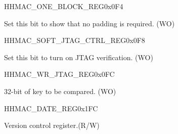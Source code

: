 \begin{register}{H}{HMAC\_ONE\_BLOCK\_REG}{0x{}0F4}\label{regdesc:HMACONEBLOCKREG}
%
%
\regnewline%
\begin{regdesc}\begin{reglist}
\label{fielddesc:HMACSETONEBLOCK}\item [HMAC\_SET\_ONE\_BLOCK] Set this bit to show that no padding is required. (WO)
\end{reglist}\end{regdesc}
\end{register}

\begin{register}{H}{HMAC\_SOFT\_JTAG\_CTRL\_REG}{0x{}0F8}\label{regdesc:HMACSOFTJTAGCTRLREG}
%
%
\regnewline%
\begin{regdesc}\begin{reglist}
\label{fielddesc:HMACSOFTJTAGCTRL}\item [HMAC\_SOFT\_JTAG\_CTRL] Set this bit to turn on JTAG verification. (WO)
\end{reglist}\end{regdesc}
\end{register}

\begin{register}{H}{HMAC\_WR\_JTAG\_REG}{0x{}0FC}\label{regdesc:HMACWRJTAGREG}
%
\regnewline%
\begin{regdesc}\begin{reglist}
\label{fielddesc:HMACWRJTAG}\item [HMAC\_WR\_JTAG] 32-bit of key to be compared. (WO)
\end{reglist}\end{regdesc}
\end{register}


\begin{register}{H}{HMAC\_DATE\_REG}{0x{}1FC}\label{regdesc:HMACDATEREG}
%
%
\regnewline%
\begin{regdesc}\begin{reglist}
\label{fielddesc:HMACDATE}\item [HMAC\_DATE] Version control register.(R/W)
\end{reglist}\end{regdesc}
\end{register}


